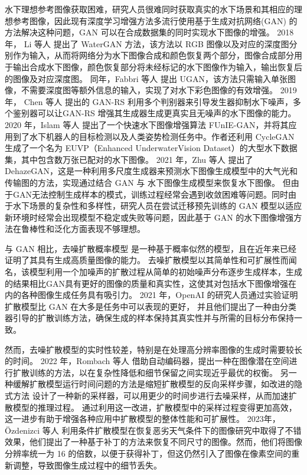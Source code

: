 水下理想参考图像获取困难，研究人员很难同时获取真实的水下场景和其相应的理想参考图像，因此现有深度学习增强方法多流行使用基于生成对抗网络(GAN) \cite{gan}的方法解决这种问题，GAN 可以在合成数据集的同时实现水下图像的增强。
2018 年， Li 等人 \cite{water_gan}提出了 WaterGAN 方法，该方法以 RGB 图像以及对应的深度图分别作为输入，从而将网络分为水下图像合成和颜色恢复两个部分，图像合成部分用于输出合成水下图像，颜色恢复部分将未经标记的水下图像作为输入，输出恢复后的图像及对应深度图。
同年，Fabbri 等人 \cite{ugan}提出 UGAN，该方法只需输入单张图像，不需要深度图等额外信息的输入，实现了对水下彩色图像的有效增强。
2019 年， Chen 等人 \cite{gan-rs}提出的 GAN-RS 利用多个判别器来引导发生器抑制水下噪声，多个鉴别器可以让GAN-RS 增强其生成器生成更真实且无噪声的水下图像的能力。
2020 年，Islam 等人 \cite{funie_gan}提出了一个快速水下图像增强算法 FUnIE-GAN，并将其应用到了水下机器人的目标检测以及人类姿势检测任务中。作者还利用 CycleGAN \cite{cycle_gan}生成了一个名为 EUVP（Enhanced UnderwaterVision Dataset）的大型水下数据集，其中包含数万张已配对的水下图像。
2021 年，Zhu 等人 \cite{dehaze_gan}提出了 DehazeGAN，这是一种利用多尺度生成器来预测水下图像生成模型中的大气光和传输图的方法，实现通过结合 GAN 与 水下图像生成模型来恢复水下图像。
但由于GAN无法控制生成样本的模式，训练过程经常会遇到收敛困难等问题。同时由于水下场景的复杂性和多样性，研究人员在尝试迁移预先训练的 GAN 模型以适应新环境时经常会出现模型不稳定或失败等问题，因此基于 GAN 的水下图像增强方法在鲁棒性和泛化方面表现不够理想。

与 GAN 相比，去噪扩散概率模型 \cite{pre_ddpm}\cite{ddpm}是一种基于概率似然的模型，且在近年来已经证明了其具有生成高质量图像的能力。
去噪扩散模型以其简单性和可扩展性而闻名，该模型利用一个加噪声的扩散过程从简单的初始噪声分布逐步生成样本，生成的结果相比GAN具有更好的图像的质量和真实性，这使其对包括水下图像增强在内的各种图像生成任务具有吸引力。
2021 年，OpenAI 的研究人员通过实验证明扩散模型比 GAN 在大多是任务中可以表现的更好， 并且他们提出了一种由分类器引导的扩散训练方法\cite{ddpm_beat_gan}，确保生成的样本保持其真实性并与所需的目标分布保持一致。

然而，去噪扩散模型的实时性较差，特别是在处理高分辨率图像的生成时需要较长的时间。
2022 年，Rombach 等人 \cite{latent}借助自动编码器，提出一种在图像潜在空间进行扩散训练的方法，以在复杂性降低和细节保留之间实现近乎最优的权衡。
另一种缓解扩散模型运行时间问题的方法是缩短扩散模型的反向采样步骤，如改进的隐式方法 \cite{improved_ddpm,ddim}设计了一种新的采样器，可以用更少的时间步进行去噪采样，从而加速扩散模型的推理过程。
通过利用这一改进，扩散模型中的采样过程变得更加高效，这一进步有助于增强各种应用中扩散模型的整体性能和可扩展性。
2023年，Özdenizci 等人 \cite{weather}利用条件扩散模型在恢复恶劣天气条件下的图像研究中取得了不错效果，他们提出了一种基于补丁的方法来恢复不同尺寸的图像。然而，他们将图像分辨率统一为 16 的倍数，以便于获得补丁，但这仍然引入了图像在像素空间的重新调整，导致图像生成过程中的细节丢失。

